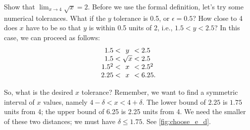 \begin{example}\label{ex_compute_lim1}
Show that $\displaystyle \lim_{x\rightarrow 4} \sqrt{x} = 2 $.
\solution
Before we use the formal definition, let's try some numerical tolerances.  What if the $y$ tolerance is 0.5, or $\epsilon =0.5$?  How close to 4 does $x$ have to be so that $y$ is within 0.5 units of 2, i.e., $1.5 < y < 2.5$?  In this case, we can proceed as follows:
\[\setlength{\arraycolsep}{0pt}
\begin{array}{rcl}
1.5 < {} & y & {} < 2.5 \\
1.5 <{} & \sqrt{x} & {}< 2.5\\
1.5^2 < {} & x & {} < 2.5^2\\
2.25 < {} & x & {} < 6.25.
\end{array}\]

So, what is the desired $x$ tolerance?  Remember, we want to find a symmetric interval of $x$ values, namely
$4 - \delta < x < 4 + \delta$.  The lower bound of $2.25$ is $1.75$ units from 4; the upper bound of 6.25 is 2.25 units from 4. We need the smaller of these two distances; we must have $\delta \leq 1.75$. See \autoref{fig:choose_e_d}.\bigskip


\end{example}
